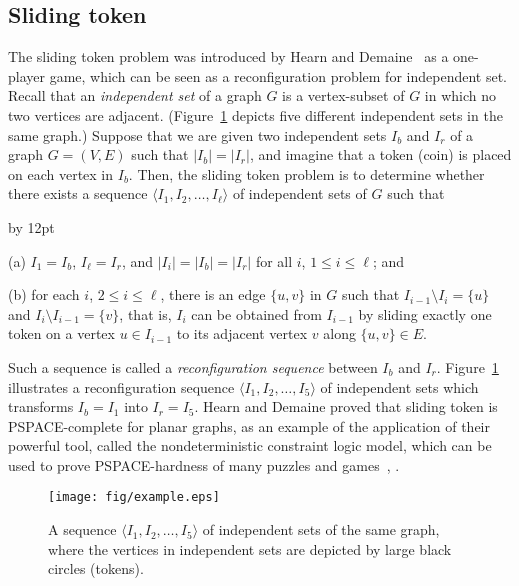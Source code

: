 \documentclass{llncs}
\newcommand{\msize}[1]{{\left|#1\right|}}
\newcommand{\bfI}{I}
\newenvironment{listing}[1]{\begin{list}{*}{\settowidth{\labelwidth}{#1}\setlength{\leftmargin}{\labelwidth}\advance \leftmargin by 12pt
\setlength{\itemsep}{0pt}\setlength{\parsep}{0pt}\setlength{\topsep}{0pt}\setlength{\parskip}{0pt}}}{\end{list}}
\newcounter{one}
\newcounter{two}
\newcounter{five}
\begin{document}
\subsection{{\sc Sliding token}}
The {\sc sliding token} problem was introduced by Hearn and Demaine~\cite{HearnDemaine2005} 
as a one-player game, which can be seen as a reconfiguration problem for {\sc independent set}. 
Recall that an {\em independent set} of a graph $G$ is a vertex-subset of $G$ in which 
no two vertices are adjacent. 
(Figure~\ref{fig:example} depicts five different independent sets in the same graph.)
Suppose that we are given two independent sets $\bfI_b$ and $\bfI_r$ of a graph 
$G = (V,E)$ such that $\msize{\bfI_b}=\msize{\bfI_r}$, 
and imagine that a token (coin) is placed on each vertex in $\bfI_b$. 
Then, the {\sc sliding token} problem is to determine 
whether there exists a sequence 
$\langle \bfI_1, \bfI_2, \ldots, \bfI_{\ell} \rangle$ of independent sets of $G$ such that
\begin{listing}{aaa}
\item[(a)] $\bfI_1=\bfI_b$, $\bfI_{\ell}=\bfI_r$, 
 and $\msize{\bfI_i} = \msize{\bfI_b}=\msize{\bfI_r}$ for all $i$, $1 \le i \le \ell$; and 
\item[(b)] for each $i$, $2 \le i \le \ell$, 
 there is an edge $\{u,v\}$ in $G$ such that $\bfI_{i-1} \setminus\bfI_{i}=\{u\}$ 
 and $\bfI_{i}\setminus\bfI_{i-1}=\{v\}$, 
 that is, $\bfI_{i}$ can be obtained from $\bfI_{i-1}$ by sliding exactly 
 one token on a vertex $u \in \bfI_{i-1}$ to its adjacent vertex $v$ along $\{u,v\} \in E$.
\end{listing}
Such a sequence is called a {\em reconfiguration sequence} between $\bfI_b$ and $\bfI_r$. 
Figure~\ref{fig:example} illustrates a reconfiguration sequence 
$\langle \bfI_1, \bfI_2, \ldots, \bfI_5 \rangle$ of independent sets 
which transforms $\bfI_b = \bfI_1$ into $\bfI_r = \bfI_5$. 
Hearn and Demaine proved that {\sc sliding token} is PSPACE-complete for planar graphs, 
as an example of the application of their powerful tool, 
called the nondeterministic constraint logic model, 
which can be used to prove PSPACE-hardness of 
many puzzles and games~\cite{HearnDemaine2005}, \cite[Sec.~9.5]{HearnDemaine2009}. 

\begin{figure}[t]
\begin{center}
\texttt{[image: fig/example.eps]}
\end{center}
\vspace{-1em}
\caption{A sequence $\langle \bfI_1, \bfI_2, \ldots, \bfI_5 \rangle$ of independent sets of the same graph, where the vertices in independent sets are depicted by large black circles (tokens).}
\label{fig:example}
\end{figure}
\end{document}
